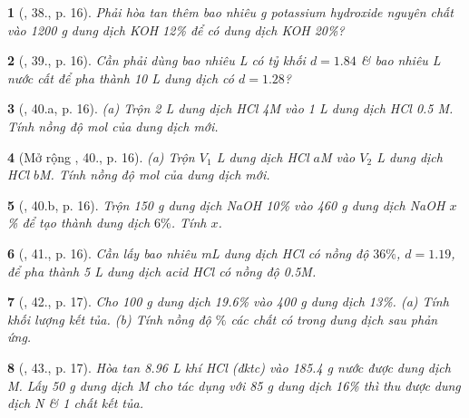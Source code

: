 \documentclass{article}
\newtheorem{baitoan}{}
\begin{document}
\begin{baitoan}[\cite{An_400_BT_Hoa_Hoc_9}, 38., p. 16]
	Phải hòa tan thêm bao nhiêu {\rm g} potassium hydroxide nguyên chất vào {\rm1200 g} dung dịch {\rm KOH 12\%} để có dung dịch {\rm KOH 20\%}?
\end{baitoan}

\begin{baitoan}[\cite{An_400_BT_Hoa_Hoc_9}, 39., p. 16]
	Cần phải dùng bao nhiêu {\rm L } có tỷ khối $d = 1.84$ \& bao nhiêu {\rm L} nước cất để pha thành {\rm10 L} dung dịch {\rm{}} có $d = 1.28$?
\end{baitoan}

\begin{baitoan}[\cite{An_400_BT_Hoa_Hoc_9}, 40.a, p. 16]
	(a) Trộn {\rm2 L} dung dịch {\rm HCl 4M} vào {\rm 1 L} dung dịch {\rm HCl 0.5 M}. Tính nồng độ mol của dung dịch mới.
\end{baitoan}

\begin{baitoan}[Mở rộng \cite{An_400_BT_Hoa_Hoc_9}, 40., p. 16]
	(a) Trộn $V_1$ {\rm L} dung dịch {\rm HCl $a$M} vào $V_2$ {\rm L} dung dịch {\rm HCl $b$M}. Tính nồng độ mol của dung dịch mới.
\end{baitoan}

\begin{baitoan}[\cite{An_400_BT_Hoa_Hoc_9}, 40.b, p. 16]
	Trộn {\rm150 g} dung dịch {\rm NaOH 10\%} vào {\rm460 g} dung dịch {\rm NaOH $x$\%} để tạo thành dung dịch $6\%$. Tính $x$.
\end{baitoan}

\begin{baitoan}[\cite{An_400_BT_Hoa_Hoc_9}, 41., p. 16]
	Cần lấy bao nhiêu {\rm mL} dung dịch {\rm HCl} có nồng độ $36\%$, $d = 1.19$, để pha thành {\rm5 L} dung dịch acid {\rm HCl} có nồng độ {\rm0.5M}.
\end{baitoan}

\begin{baitoan}[\cite{An_400_BT_Hoa_Hoc_9}, 42., p. 17]
	Cho {\rm100 g} dung dịch {\rm{} 19.6\%} vào {\rm400 g} dung dịch {\rm{} 13\%}. (a) Tính khối lượng kết tủa. (b) Tính nồng độ $\%$ các chất có trong dung dịch sau phản ứng.
\end{baitoan}

\begin{baitoan}[\cite{An_400_BT_Hoa_Hoc_9}, 43., p. 17]
	Hòa tan {\rm8.96 L} khí {\rm HCl} (đktc) vào {\rm185.4 g} nước được dung dịch M. Lấy {\rm50 g} dung dịch M cho tác dụng với {\rm85 g} dung dịch {\rm{} 16\%} thì thu được dung dịch N \& 1 chất kết tủa.
\end{baitoan}
\end{document}
